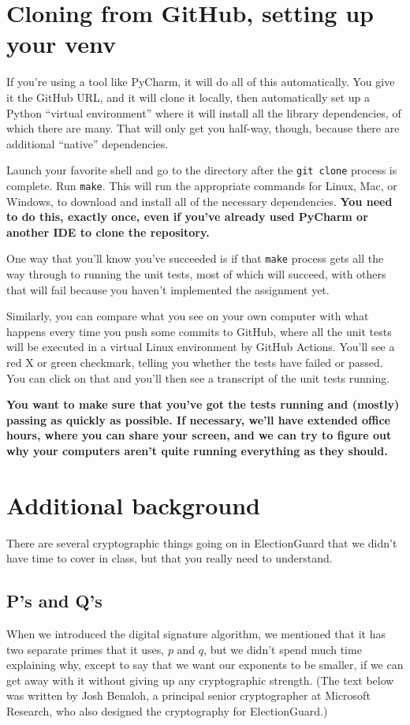 \documentclass[letterpaper,12pt]{article}
\begin{document}
\section{Cloning from GitHub, setting up your venv}
If you're using a tool like PyCharm, it will do all of this
automatically. You give it the GitHub URL, and it will clone
it locally, then automatically set up a Python ``virtual environment''
where it will install all the library dependencies, of which there
are many. That will only get you half-way, though, because there
are additional ``native'' dependencies.

Launch your favorite shell and go to the directory after the {\tt git
clone} process is complete. Run {\tt make}. This will run the
appropriate commands for Linux, Mac, or Windows, to download and
install all of the necessary dependencies. {\bf You need to do this,
  exactly once, even if you've already used PyCharm or another IDE
  to clone the repository.}

One way that you'll know you've succeeded is if that {\tt make}
process gets all the way through to running the unit tests, most
of which will succeed, with others that will fail because you haven't
implemented the assignment yet.

Similarly, you can compare what you see on your own computer with
what happens every time you push some commits to GitHub, where all
the unit tests will be executed in a virtual Linux environment
by GitHub Actions. You'll see a red X or green checkmark, telling you
whether the tests have failed or passed. You can click on that
and you'll then see a transcript of the unit tests running.

{\bf You want to make sure that you've got the tests running and
  (mostly) passing as quickly as possible. If necessary, we'll have
  extended office hours, where you can share your screen, and we can
  try to figure out why your computers aren't quite running everything
  as they should.}

\section{Additional background}
There are several cryptographic things going on in ElectionGuard that
we didn't have time to cover in class, but that you really need to
understand.

\subsection{P's and Q's}
When we introduced the digital signature algorithm, we mentioned that
it has two separate primes that it uses, $p$ and $q$, but we didn't
spend much time explaining why, except to say that we want our
exponents to be smaller, if we can get away with it without giving up
any cryptographic strength. (The text below was written by 
Josh Benaloh, a principal senior cryptographer at Microsoft Research,
who also designed the cryptography for ElectionGuard.)
\end{document}
